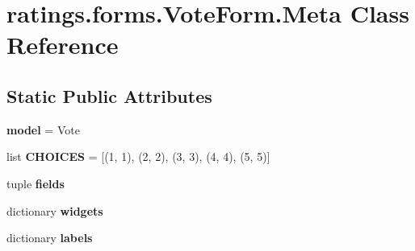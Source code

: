 \hypertarget{classratings_1_1forms_1_1VoteForm_1_1Meta}{\section{ratings.\-forms.\-Vote\-Form.\-Meta Class Reference}
\label{classratings_1_1forms_1_1VoteForm_1_1Meta}
}
\subsection*{Static Public Attributes}
\begin{DoxyCompactItemize}
\item 
\hypertarget{classratings_1_1forms_1_1VoteForm_1_1Meta_a35547c426ff6efd87351a80d1d6af337}{{\bfseries model} = Vote}\label{classratings_1_1forms_1_1VoteForm_1_1Meta_a35547c426ff6efd87351a80d1d6af337}

\item 
\hypertarget{classratings_1_1forms_1_1VoteForm_1_1Meta_a53c7794e98b0e8030e7533836796bffa}{list {\bfseries C\-H\-O\-I\-C\-E\-S} = \mbox{[}(1, 1), (2, 2), (3, 3), (4, 4), (5, 5)\mbox{]}}\label{classratings_1_1forms_1_1VoteForm_1_1Meta_a53c7794e98b0e8030e7533836796bffa}

\item 
tuple {\bfseries fields}
\item 
dictionary {\bfseries widgets}
\item 
dictionary {\bfseries labels}
\end{DoxyCompactItemize}



